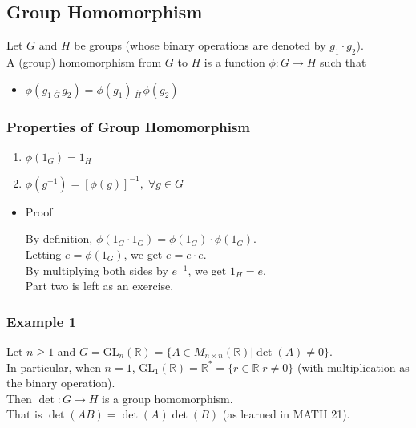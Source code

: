 \documentclass[11pt]{article}
\newcommand{\0}{\emptyset}
\newcommand{\R}{\mathbb{R}}
\begin{document}
\subsection*{Group Homomorphism}
\label{sec:org488d2c1}
Let \(G\) and \(H\) be groups (whose binary operations are denoted by \(g_{1}\cdot g_{2}\)).\\[0pt]
A (group) homomorphism from \(G\) to \(H\) is a function \(\phi:G\to H\) such that\\[0pt]
\begin{itemize}
\item \(\phi(g_{1}\underset{G}{\cdot}g_{2})=\phi(g_{1})\underset{H}{\cdot}\phi(g_{2})\)\\[0pt]
\end{itemize}
\subsubsection*{Properties of Group Homomorphism}
\label{sec:orgc57cd1d}
\begin{enumerate}
\item \(\phi(1_{G})=1_{H}\)\\[0pt]
\item \(\phi(g^{-1})=[\phi(g)]^{-1},\;\forall g\in G\)\\[0pt]
\end{enumerate}
\begin{itemize}
\item Proof
\label{sec:org7ee8cdf}

By definition, \(\phi(1_{G}\cdot 1_{G})=\phi(1_{G})\cdot\phi(1_{G})\).\\[0pt]
Letting \(e=\phi(1_{G})\), we get \(e=e\cdot e\).\\[0pt]
By multiplying both sides by \(e^{-1}\), we get \(1_{H}=e\).\\[0pt]
Part two is left as an exercise.\\[0pt]
\end{itemize}
\subsubsection*{Example 1}
\label{sec:org6000e0e}
Let \(n\geq1\) and \(G=\text{GL}_{n}(\R)=\{A\in M_{n\times n}(\R)|\det(A)\neq0\}\).\\[0pt]
In particular, when \(n=1\), \(\text{GL}_{1}(\R)=\R^{*}=\{r\in\R|r\neq 0\}\) (with multiplication as the binary operation).\\[0pt]
Then \(\det:G\to H\) is a group homomorphism.\\[0pt]
That is \(\det(AB)=\det(A)\det(B)\) (as learned in MATH 21).\\[0pt]
\end{document}
